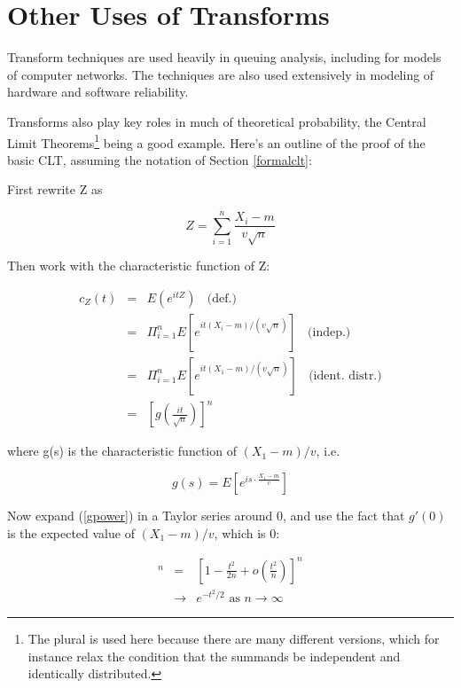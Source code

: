 \section{Other Uses of Transforms}

Transform techniques are used heavily in queuing analysis, including for
models of computer networks.  The techniques are also used extensively
in modeling of hardware and software reliability.

Transforms also play key roles in much of theoretical probability, the
Central Limit Theorems\footnote{The plural is used here because there
are many different versions, which for instance relax the condition that
the summands be independent and identically distributed.} being a good
example.  Here's an outline of the proof of the basic CLT, assuming the
notation of Section \ref{formalclt}:

First rewrite Z as

\begin{equation}
Z = \sum_{i=1}^n \frac{X_i - m}{v \sqrt{n}}
\end{equation}

Then work with the characteristic function of Z:

\begin{eqnarray}
c_Z(t) &=& E(e^{itZ}) ~~~~ \textrm{(def.)} \\ 
&=& \Pi_{i=1}^n E[e^{it(X_i-m)/(v\sqrt{n})}] ~~~~ \textrm{(indep.)} \\
&=&  \Pi_{i=1}^n E[e^{it(X_1-m)/(v\sqrt{n})}] ~~~~ \textrm{(ident. distr.)} \\
&=& [g(\frac{it}{\sqrt{n}})]^n
\label{gpower}
\end{eqnarray}

where g(s) is the characteristic function of $(X_1-m)/v$, i.e.

\begin{equation}
g(s) = E[e^{is \cdot \frac{X_1 - m}{v}}]
\end{equation}

Now expand (\ref{gpower}) in a Taylor series around 0, and use the fact
that $g'(0)$ is the expected value of $(X_1-m)/v$, which is 0:

\begin{eqnarray}
[g(\frac{t}{\sqrt{n}})]^n 
&=& \left [1 - \frac{t^2}{2n} + o(\frac{t^2}{n}) \right ]^n \\
&\rightarrow& e^{-t^2/2} \textrm{ as } n \rightarrow \infty
\label{ourcltgoal}
\end{eqnarray}

